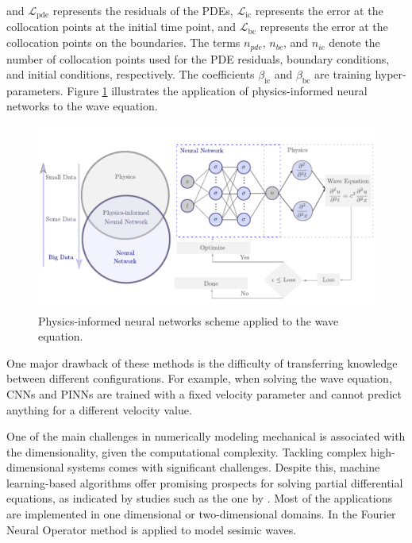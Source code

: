 \documentclass[11pt,twoside]{article}
\begin{document}
and \( \mathcal{L}_{\text{pde}} \) represents the residuals of the PDEs, \( \mathcal{L}_{\text{ic}} \) represents the error at the 
collocation points at the initial time point, and \( \mathcal{L}_{\text{bc}} \) represents the error at the collocation points 
on the boundaries. The terms \( n_{pde} \), \( n_{bc} \), and \( n_{ic} \) denote the number of collocation points used for the 
PDE residuals, boundary conditions, and initial conditions, respectively. The coefficients \(\beta_{\text{ic}}\) and \(\beta_{\text{bc}}\) 
are training hyper-parameters. Figure \ref{fig:physics_informed_neural_networks} illustrates the application of physics-informed 
neural networks to the wave equation.

\begin{figure}[h]
    \centering
        \includegraphics[width=1.0\textwidth]{figs/scheme_PINNs_waves.pdf}
        \caption{Physics-informed neural networks scheme applied to the wave equation.}
        \label{fig:physics_informed_neural_networks}
\end{figure}
    

One major drawback of these methods is the difficulty of transferring knowledge between different configurations. For example, when solving 
the wave equation, CNNs and PINNs are trained with a fixed velocity parameter and cannot predict anything for a different velocity value. 

One of the main challenges in numerically modeling mechanical is associated with the dimensionality, given the computational complexity. 
Tackling complex high-dimensional systems comes with significant challenges. Despite this, machine learning-based algorithms offer promising 
prospects for solving partial differential equations, as indicated by studies such as the one by . 
Most of the applications are implemented in one dimensional or two-dimensional domains. In  the Fourier 
Neural Operator method is applied to model sesimic waves.
\end{document}
